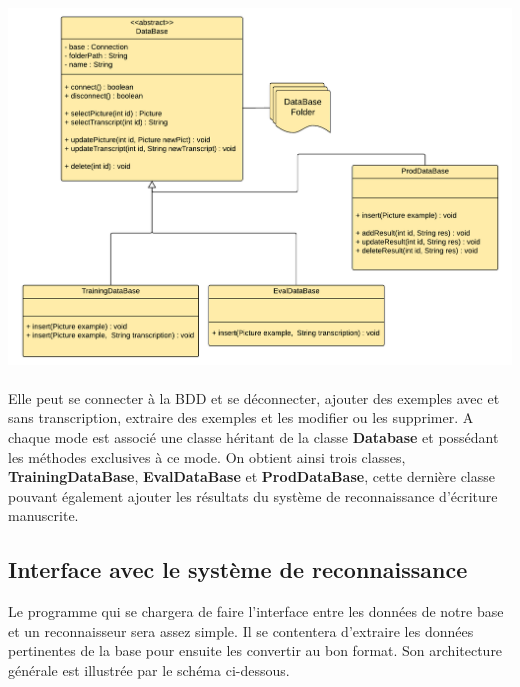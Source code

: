 \begin{mdframed}[frametitle={Figure 13 : Diagramme de classes de l'interface avec la BDD}, innerbottommargin=10]
\begin{center}
\includegraphics[scale=0.5]{bdd.pdf}
\end{center}
\end{mdframed}

\paragraph{}

Elle peut se connecter à la BDD et se déconnecter, ajouter des exemples avec
et sans transcription, extraire des exemples et les modifier ou les supprimer.
A chaque mode est associé une classe héritant de la classe \textbf{Database}
et possédant les méthodes exclusives à ce mode. On obtient ainsi trois
classes, \textbf{TrainingDataBase}, \textbf{EvalDataBase} et
\textbf{ProdDataBase}, cette dernière classe pouvant également ajouter les
résultats du système de reconnaissance d'écriture manuscrite.

\subsection{Interface avec le système de reconnaissance}

Le programme qui se chargera de faire l’interface entre les données de notre
base et un reconnaisseur sera assez simple. Il se contentera d’extraire les
données pertinentes de la base pour ensuite les convertir au bon format.
Son architecture générale est illustrée par le schéma ci-dessous.

